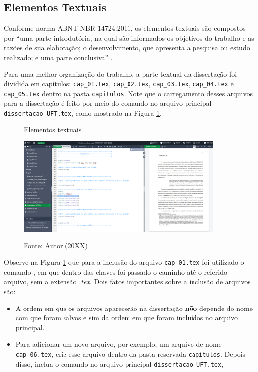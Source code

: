 \begin{apendicesenv}
\section*{Elementos Textuais}

Conforme norma ABNT NBR 14724:2011, os elementos textuais são compostos por ``uma parte introdutória, na qual são informados os objetivos do trabalho e as razões de sua elaboração; o desenvolvimento, que apresenta a pesquisa ou estudo realizado; e uma parte conclusiva'' \cite[p.~8]{nbr14724}.

Para uma melhor organização do trabalho, a parte textual da dissertação foi dividida em capítulos: \verb|cap_01.tex|, \verb|cap_02.tex|, \verb|cap_03.tex|, \verb|cap_04.tex| e \verb|cap_05.tex| dentro na pasta \verb|capitulos|.  Note que o carregamento desses arquivos para a dissertação é feito por meio do comando \verb|| no arquivo principal \verb|dissertacao_UFT.tex|, como mostrado na Figura \ref{fig:textual-01}.

\begin{figure}[H]
    \centering
    \caption{Elementos textuais}
    \includegraphics[width=0.9\textwidth]{img/modelo/textual-01.png}
    \\
    \caption*{\small{Fonte: Autor (20XX)}}
    \label{fig:textual-01}
\end{figure}

Observe na Figura \ref{fig:textual-01} que para a inclusão do arquivo \verb|cap_01.tex| foi utilizado o comando \verb||, em que dentro das chaves foi passado o caminho até o referido arquivo, sem a extensão \textit{.tex}. Dois fatos importantes sobre a inclusão de arquivos são:
\begin{itemize}
    \item A ordem em que os arquivos aparecerão na dissertação \textbf{não} depende do nome com que foram salvos e sim da ordem em que foram incluídos no arquivo principal. 
    \item Para adicionar um novo arquivo, por exemplo, um arquivo de nome \verb|cap_06.tex|, crie esse arquivo dentro da pasta reservada \verb|capitulos|. Depois disso, inclua o comando \verb|| no arquivo principal \verb|dissertacao_UFT.tex|, 
\end{itemize}



\end{apendicesenv}
